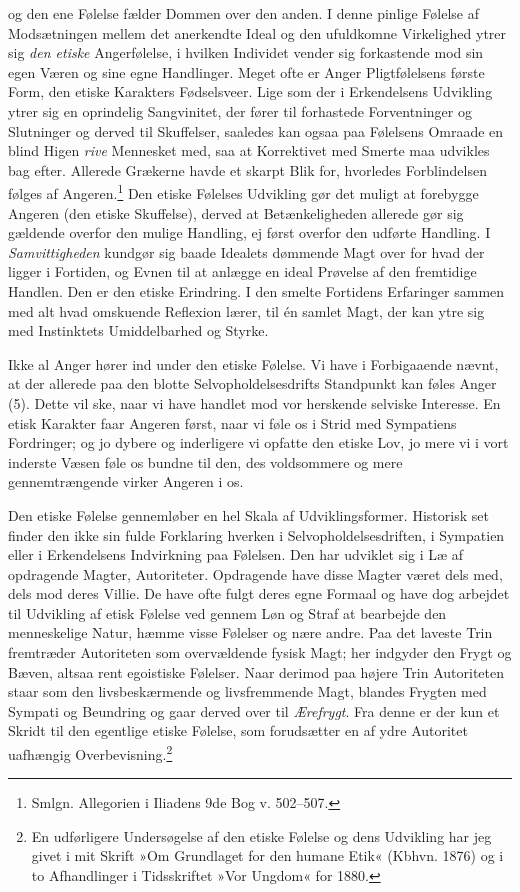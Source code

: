 \documentclass[12pt,a4paper,openany]{book}
\newcommand{\opage}[1]{\marginnote{\footnotesize\textit{[#1]}}}
\begin{document}
og den ene Følelse fælder Dommen over den anden. I denne pinlige Følelse
af Modsætningen mellem det anerkendte Ideal og den ufuldkomne
Virkelighed ytrer sig \emph{den etiske} Angerfølelse, i hvilken
Individet vender sig forkastende mod sin egen Væren og sine egne
Handlinger. Meget ofte er Anger Pligtfølelsens første Form, den etiske
Karakters Fødselsveer. Lige som der i Erkendelsens Udvikling ytrer sig
en oprindelig Sangvinitet, der fører til forhastede Forventninger og
Slutninger og derved til Skuffelser, saaledes kan ogsaa paa Følelsens
Omraade en blind Higen \emph{rive} Mennesket med, saa at Korrektivet med
Smerte maa udvikles bag efter. Allerede Grækerne havde et skarpt Blik
for, hvorledes Forblindelsen følges af Angeren.\footnote[1]{Smlgn.
Allegorien i Iliadens 9de Bog v. 502--507.} Den etiske Følelses Udvikling
gør det muligt at forebygge Angeren (den etiske Skuffelse), derved at
Betænkeligheden allerede gør sig gældende overfor den mulige Handling,
ej først overfor den udførte Handling. I \emph{Samvittigheden} kundgør
sig baade Idealets dømmende Magt over for hvad der ligger i Fortiden, og
Evnen til at anlægge en ideal Prøvelse af den fremtidige Handlen. Den er
den etiske Erindring. I den smelte Fortidens Erfaringer sammen med alt
hvad omskuende Reflexion lærer, til én samlet Magt, der kan ytre sig med
Instinktets Umiddelbarhed og Styrke.

Ikke al Anger hører ind under den etiske Følelse. Vi have i Forbigaaende
nævnt, at der allerede paa den blotte Selvopholdelsesdrifts Standpunkt
kan føles Anger (5). Dette vil ske, naar vi have handlet mod vor
herskende selviske Interesse. En etisk Karakter faar Angeren først, naar
vi føle os i Strid med Sympatiens Fordringer; og jo dybere og
inderligere vi opfatte den etiske Lov, jo mere vi i vort inderste Væsen
føle os bundne til den, des voldsommere og mere gennemtrængende virker
Angeren i os.

Den etiske Følelse gennemløber en hel Skala af Udviklingsformer.
Historisk set finder den ikke sin fulde Forklaring hverken i
Selvopholdelsesdriften, i Sympatien eller i Erkendelsens Indvirkning paa
Følelsen. Den har udviklet sig i Læ
\opage{312}af opdragende Magter, Autoriteter. Opdragende have disse
Magter været dels med, dels mod deres Villie. De have ofte fulgt deres
egne Formaal og have dog arbejdet til Udvikling af etisk Følelse ved
gennem Løn og Straf at bearbejde den menneskelige Natur, hæmme visse
Følelser og nære andre. Paa det laveste Trin fremtræder Autoriteten som
overvældende fysisk Magt; her indgyder den Frygt og Bæven, altsaa rent
egoistiske Følelser. Naar derimod paa højere Trin Autoriteten staar som
den livsbeskærmende og livsfremmende Magt, blandes Frygten med Sympati
og Beundring og gaar derved over til \emph{Ærefrygt}. Fra denne er der
kun et Skridt til den egentlige etiske Følelse, som forudsætter en af
ydre Autoritet uafhængig Overbevisning.\footnote[1]{En udførligere
Undersøgelse af den etiske Følelse og dens Udvikling har jeg givet i mit
Skrift »Om Grundlaget for den humane Etik« (Kbhvn. 1876) og i to
Afhandlinger i Tidsskriftet »Vor Ungdom« for 1880.}
\end{document}
